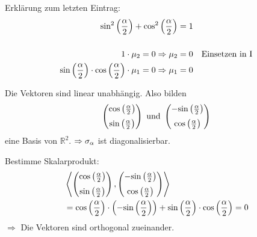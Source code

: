 Erklärung zum letzten Eintrag:
\begin{align*}
	\text{sin}^2\left(\frac{\alpha}{2}\right) + \text{cos}^2\left(\frac{\alpha}{2}\right) &= 1 \\[0.5cm]
	1\cdot\mu_2 = 0 \Rightarrow \mu_2 &= 0\quad\text{Einsetzen in I} \\
	\sinah\cdot\cosah\cdot\mu_1 = 0 \Rightarrow \mu_1 &= 0
\end{align*}

Die Vektoren sind linear unabhängig. Also bilden
\begin{align*}
	\begin{pmatrix}
		\cosah \\[2mm]
		\sinah
	\end{pmatrix}\text{ und }\begin{pmatrix}
		-\sinah \\[2mm]
		\cosah
	\end{pmatrix}
\end{align*}
eine Basis von $\mathbb{R}^2$. $\Rightarrow \sigalph$ ist diagonalisierbar.

Bestimme Skalarprodukt:
\begin{align*}
	&\left\langle \begin{pmatrix}
		\cosah \\[2mm]
		\sinah
	\end{pmatrix}, \begin{pmatrix}
		-\sinah \\[2mm]
		\cosah
	\end{pmatrix}\right\rangle \\
	&= \cosah\cdot\left(-\sinah\right) + \sinah\cdot\cosah = 0
\end{align*}
$\Rightarrow$ Die Vektoren sind orthogonal zueinander.

